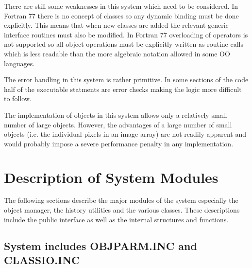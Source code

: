    There are still some weaknesses in this system which need to be
considered.  In Fortran 77 there is no concept of classes so any
dynamic binding
must be done explicitly.  This means that when new classes are added
the relevant generic interface routines must also be modified.
In Fortran 77 overloading of operators is not supported so all object
operations must be explicitly written as routine calls which is less
readable than the more algebraic notation allowed in some OO
languages.

   The error handling in this system is rather primitive.  In some
sections of the code half of the executable statments are error checks
making the logic more difficult to follow.

   The implementation of objects in this system allows only a
relatively small number of large objects.  However, the advantages of
a large number of small objects (i.e. the individual pixels in an
image array) are not readily apparent and would probably impose a
severe performance penalty in any implementation.

\section{Description of System Modules}

   The following sections describe the major modules of the system
especially the object manager, the history utilities and the various
classes.  These descriptions include the public interface as well as
the internal structures and functions.

\subsection{System includes OBJPARM.INC and CLASSIO.INC}

